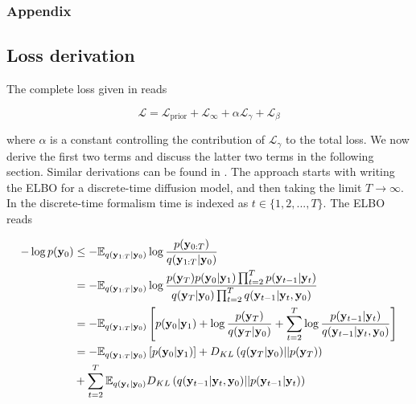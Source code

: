 \subsubsection{Appendix}

\subsection{Loss derivation}

The complete loss given in \parencite{Maggiora2023} reads

\begin{equation}
\mathcal{L} = \mathcal{L}_{\mathrm{prior}} + \mathcal{L}_{\infty} + \alpha\mathcal{L}_{\gamma} + \mathcal{L}_{\beta}
\end{equation}

where $\alpha$ is a constant controlling the contribution of $\mathcal{L}_{\gamma}$ to the total loss. We now derive the first two terms and discuss the latter two terms in the following section. Similar derivations can be found in \parencite{Maggiora2023,Kingma2021,Ribeiro2024}. The approach starts with writing the ELBO for a discrete-time diffusion model, and then taking the limit $T\rightarrow \infty$. In the discrete-time formalism time is indexed as $t\in \{1,2,...,T\}$. The ELBO reads

\begin{align*}
-\log p(\bold{y}_{0}) &\leq - \mathbb{E}_{q(\bold{y}_{1:T}\lvert\bold{y}_{0})} \log \frac{p(\bold{y}_{0:T})}{q(\bold{y}_{1:T}\lvert\bold{y}_{0})}\\
&= -\mathbb{E}_{q(\bold{y}_{1:T}\lvert\bold{y}_{0})} \log \frac{p(\bold{y}_{T})p(\bold{y}_0\lvert\bold{y}_1) \prod_{t=2}^{T}p(\bold{y}_{t-1}\lvert\bold{y}_t)}{q(\bold{y}_T\lvert\bold{y}_0)\prod_{t=2}^{T}q(\bold{y}_{t-1}\lvert\bold{y}_t,\bold{y}_0)}\\
&= -\mathbb{E}_{q(\bold{y}_{1:T}\lvert\bold{y}_{0})} \left[ p(\bold{y}_0\lvert\bold{y}_1) + \log \frac{p(\bold{y}_{T})}{q(\bold{y}_T\lvert\bold{y}_0)} + \sum_{t=2}^{T} \log \frac{p(\bold{y}_{t-1}\lvert\bold{y}_t)}{q(\bold{y}_{t-1}\lvert\bold{y}_t,\bold{y}_0)}\right]\\
&= -\mathbb{E}_{q(\bold{y}_{1:T}\lvert\bold{y}_{0})} \left[ p(\bold{y}_0\lvert\bold{y}_1)\right] + D_{KL}\left(q(\bold{y}_T\lvert\bold{y}_0) \lvert\lvert p(\bold{y}_{T})\right) \\
&+ \sum_{t=2}^{T} \mathbb{E}_{q(\bold{y}_{t}\lvert\bold{y}_{0})} D_{KL}\left(q(\bold{y}_{t-1}\lvert\bold{y}_t,\bold{y}_0)\lvert\lvert p(\bold{y}_{t-1}\lvert\bold{y}_t) \right)
\end{align*}


